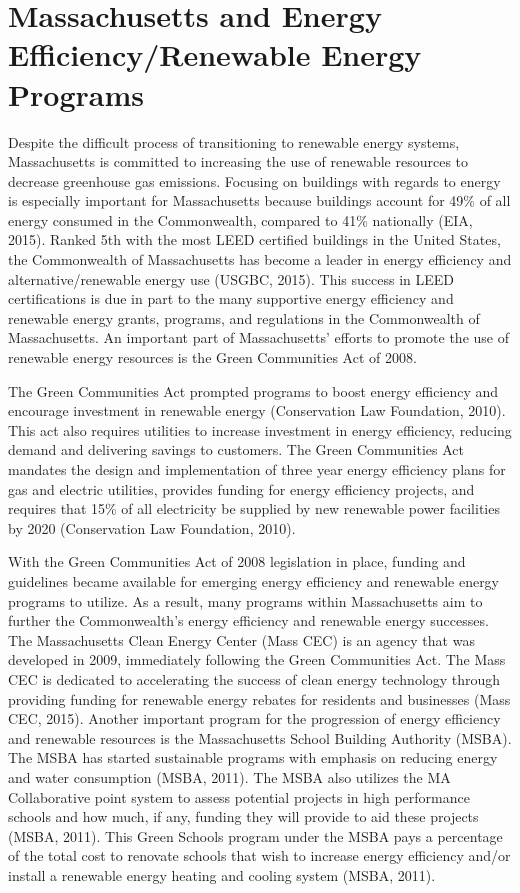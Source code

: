   \section{Massachusetts and Energy Efficiency/Renewable Energy Programs}
  \par Despite the difficult process of transitioning to renewable energy systems, Massachusetts is committed to increasing the use of renewable resources to decrease greenhouse gas emissions. Focusing on buildings with regards to energy is especially important for Massachusetts because buildings account for 49\% of all energy consumed in the Commonwealth, compared to 41\% nationally (EIA, 2015). Ranked 5th with the most LEED certified buildings in the United States, the Commonwealth of Massachusetts has become a leader in energy efficiency and alternative/renewable energy use (USGBC, 2015). This success in LEED certifications is due in part to the many supportive energy efficiency and renewable energy grants, programs, and regulations in the Commonwealth of Massachusetts. An important part of Massachusetts' efforts to promote the use of renewable energy resources is the Green Communities Act of 2008.
  \par The Green Communities Act prompted programs to boost energy efficiency and encourage investment in renewable energy (Conservation Law Foundation, 2010). This act also requires utilities to increase investment in energy efficiency, reducing demand and delivering savings to customers. The Green Communities Act mandates the design and implementation of three year energy efficiency plans for gas and electric utilities, provides funding for energy efficiency projects, and requires that 15\% of all electricity be supplied by new renewable power facilities by 2020  (Conservation Law Foundation, 2010).
  \par With the Green Communities Act of 2008 legislation in place, funding and guidelines became available for emerging energy efficiency and renewable energy programs to utilize. As a result, many programs within Massachusetts aim to further the Commonwealth's energy efficiency and renewable energy successes. The Massachusetts Clean Energy Center (Mass CEC) is an agency that was developed in 2009, immediately following the Green Communities Act. The Mass CEC  is dedicated to accelerating the success of clean energy technology through providing funding for renewable energy rebates for residents and businesses (Mass CEC, 2015). Another important program for the progression of energy efficiency and renewable resources is the Massachusetts School Building Authority (MSBA). The MSBA has started sustainable programs with emphasis on reducing energy and water consumption (MSBA, 2011). The MSBA also utilizes the MA Collaborative point system to assess potential projects in high performance schools and how much, if any, funding they will provide to aid these projects (MSBA, 2011). This Green Schools program under the MSBA pays a percentage of the total cost to renovate schools that wish to increase energy efficiency and/or install a renewable energy heating and cooling system (MSBA, 2011).


